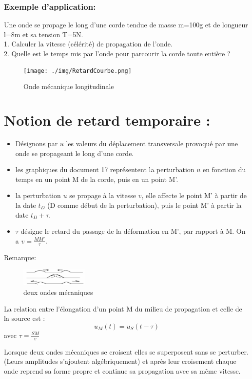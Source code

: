 \documentclass[12pt]{article}
\begin{document}
\subsubsection{Exemple d'application:}
Une onde se propage le long d'une corde tendue de masse m=100g et de longueur l=8m et sa tension T=5N.
\\1. Calculer la vitesse (célérité) de propagation de l'onde.
\\2. Quelle est le temps mis par l'onde pour parcourir la corde toute entière ?
\begin{figure}	
			\texttt{[image: ./img/RetardCourbe.png]}
			\caption{Onde mécanique longitudinale}
\end{figure}
\section{Notion de retard temporaire :}
\begin{itemize}	
	\item Désignons par $u$ les valeurs du déplacement transversale provoqué par une onde se propageant le long d'une corde.

	\item les graphiques du document 17 représentent la perturbation $u$ en fonction du temps en un point M de la corde, puis en un point M'.

	\item la perturbation $u$ se propage à la vitesse $v$, elle affecte le point M' à partir de la date $t_D$ (D comme début de la perturbation), puis le point M' à partir la date $t_D+\tau$.
\item $\tau$ désigne le retard du passage de la déformation en M', par rapport à M. On a $v = \frac{MM'}{\tau}$.
\end{itemize}
Remarque:

\begin{tcolorbox}
\begin{figure}	
			\includegraphics[width=0.3\textwidth]{./img/eux ondes mécaniques se croisent.png}
			\caption{deux ondes mécaniques }
\end{figure}
	La relation entre l'élongation d'un point M du milieu de propagation et celle de la source est : $$u_M(t) = u_S(t-\tau)$$ avec $\tau = \frac{SM}{v}$

	Lorsque deux ondes mécaniques se croisent elles se superposent sans se perturber. (Leurs amplitudes s'ajoutent algébriquement)
et après leur croisement chaque onde reprend sa forme propre et continue sa propagation avec sa même vitesse.

\end{tcolorbox}
\end{document}
